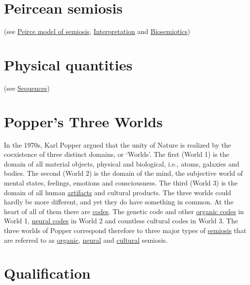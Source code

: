 \documentclass[12pt]{article}
\begin{document}
\hypertarget{peircean_semiosis}{}
\section{Peircean semiosis} (see \hyperlink{peirce_model_of_semiosis}{Peirce model of semiosis}, \hyperlink{interpretation}{Interpretation} and \hyperlink{biosemiotics}{Biosemiotics})


\hypertarget{physical_quantities}{}
\section{Physical quantities} (see \hyperlink{sequences}{Sequences})

\hypertarget{poppers_three_worlds}{}
\section{Popper's Three Worlds} 
In the 1970s, Karl Popper argued that the unity of Nature is realized by the coexistence of three distinct domains, or `Worlds'. The first (World 1) is the domain of all material objects, physical and biological, i.e., atoms, galaxies and bodies. The second (World 2) is the domain of the mind, the subjective world of mental states, feelings, emotions and consciousness. The third (World 3) is the domain of all human \hyperlink{artifacts}{artifacts} and cultural products. The three worlds could hardly be more different, and yet they do have something in common. At the heart of all of them there are \hyperlink{code}{codes}. The genetic code and other \hyperlink{organic_codes}{organic codes} in World 1, \hyperlink{neural_codes}{neural codes} in World 2 and countless cultural codes in World 3. The three worlds of Popper correspond therefore to three major types of \hyperlink{semiosis}{semiosis} that are referred to as \hyperlink{organic_semiosis}{organic}, \hyperlink{neural_semiosis}{neural} and \hyperlink{cultural_semiosis}{cultural} semiosis. 

\hypertarget{qualification}{}
\section{Qualification}

\hypertarget{quantities_qualities_nominables}{}
\end{document}
